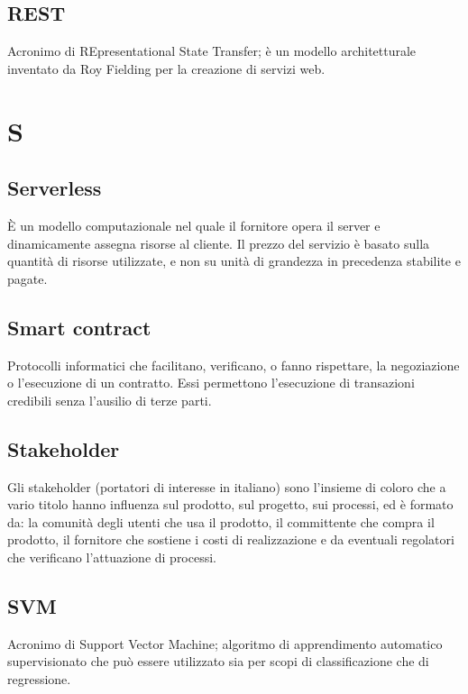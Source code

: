 \subsection*{REST}
Acronimo di REpresentational State Transfer; è un modello architetturale inventato da Roy Fielding per la creazione di servizi web.

\clearpage
\section*{S}


\subsection*{Serverless}
È un modello computazionale nel quale il fornitore opera il server e dinamicamente assegna risorse al cliente. Il prezzo del servizio è basato sulla quantità di risorse utilizzate, e non su unità di grandezza in precedenza stabilite e pagate.

\subsection*{Smart contract}
Protocolli informatici che facilitano, verificano, o fanno rispettare, la negoziazione o l'esecuzione di un contratto. Essi permettono l'esecuzione di transazioni credibili senza l'ausilio di terze parti.

\subsection*{Stakeholder}
Gli stakeholder (portatori di interesse in italiano) sono l’insieme di coloro che a vario titolo hanno influenza sul prodotto, sul progetto, sui processi, ed è formato da: la comunità degli utenti che usa il prodotto, il committente che compra il prodotto, il fornitore che sostiene i costi di realizzazione e da eventuali regolatori che verificano l’attuazione di processi.

\subsection*{SVM}
Acronimo di Support Vector Machine; algoritmo di apprendimento automatico supervisionato che può essere utilizzato sia per scopi di classificazione che di regressione.

